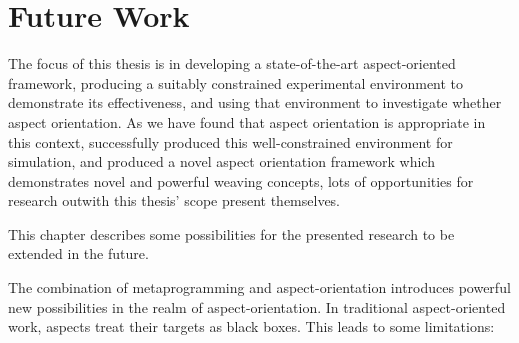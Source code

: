 \chapter{Future Work}\label{chap:future_work}

The focus of this thesis is in developing a state-of-the-art aspect-oriented 
framework, producing a suitably constrained experimental environment to
demonstrate its effectiveness, and using that environment to investigate whether
aspect orientation. As we have found that aspect orientation is
appropriate in this context, successfully produced this well-constrained
environment for simulation, and produced a novel aspect orientation framework
which demonstrates novel and powerful weaving concepts, lots of opportunities
for research outwith this thesis' scope present themselves.

This chapter describes some possibilities for the presented research to be
extended in the future.




The combination of metaprogramming and aspect-orientation introduces powerful
new possibilities in the realm of aspect-orientation. In traditional
aspect-oriented work, aspects treat their targets as black boxes. This leads to
some limitations:

